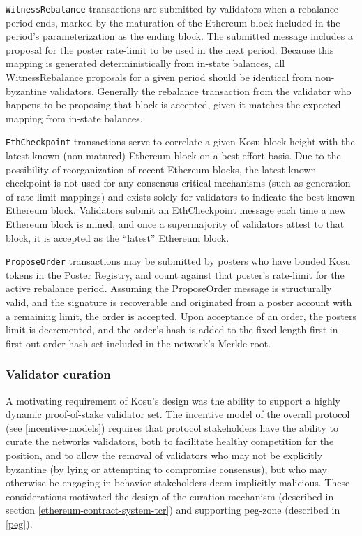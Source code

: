 \documentclass[10pt]{article}
\begin{document}
\texttt{WitnessRebalance} transactions are submitted by validators when a rebalance period ends, marked by the maturation of the Ethereum block included in the period’s parameterization as the ending block. The submitted message includes a proposal for the poster rate-limit to be used in the next period. Because this mapping is generated deterministically from in-state balances, all WitnessRebalance proposals for a given period should be identical from non-byzantine validators. Generally the rebalance transaction from the validator who happens to be proposing that block is accepted, given it matches the expected mapping from in-state balances. 
\medskip

\texttt{EthCheckpoint} transactions serve to correlate a given Kosu block height with the latest-known (non-matured) Ethereum block on a best-effort basis. Due to the possibility of reorganization of recent Ethereum blocks, the latest-known checkpoint is not used for any consensus critical mechanisms (such as generation of rate-limit mappings) and exists solely for validators to indicate the best-known Ethereum block. Validators submit an EthCheckpoint message each time a new Ethereum block is mined, and once a supermajority of validators attest to that block, it is accepted as the “latest” Ethereum block. 
\medskip

\texttt{ProposeOrder} transactions may be submitted by posters who have bonded Kosu tokens in the Poster Registry, and count against that poster’s rate-limit for the active rebalance period. Assuming the ProposeOrder message is structurally valid, and the signature is recoverable and originated from a poster account with a remaining limit, the order is accepted. Upon acceptance of an order, the posters limit is decremented, and the order’s hash is added to the fixed-length first-in-first-out order hash set included in the network’s Merkle root.
\subsubsection{Validator curation}\label{tm-network-validators}
A motivating requirement of Kosu’s design was the ability to support a highly dynamic proof-of-stake validator set. The incentive model of the overall protocol (see \ref{incentive-models}) requires that protocol stakeholders have the ability to curate the networks validators, both to facilitate healthy competition for the position, and to allow the removal of validators who may not be explicitly byzantine (by lying or attempting to compromise consensus), but who may otherwise be engaging in behavior stakeholders deem implicitly malicious. These considerations motivated the design of the curation mechanism (described in section \ref{ethereum-contract-system-tcr}) and supporting peg-zone (described in \ref{peg}).
\medskip
\end{document}
